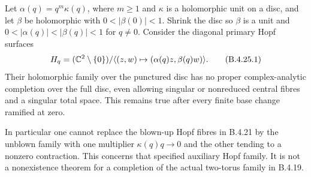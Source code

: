 \begin{proposition}
\label{push:B425}
Let $\alpha(q)=q^m\kappa(q)$, where $m\ge1$ and
$\kappa$ is a holomorphic unit on a disc, and let $\beta$
be holomorphic with $0<|\beta(0)|<1$. Shrink the disc so
$\beta$ is a unit and $0<|\alpha(q)|<|\beta(q)|<1$ for
$q\ne0$. Consider the diagonal primary Hopf surfaces
\[
 H_q=(\mathbb C^2\setminus\{0\})/
       \langle(z,w)\mapsto(\alpha(q)z,\beta(q)w)\rangle.
                                                        \tag{B.4.25.1}
\]
Their holomorphic family over the punctured disc has no
proper complex-analytic completion over the full disc,
even allowing singular or nonreduced central fibres and
a singular total space. This remains true after every
finite base change ramified at zero.

In particular one cannot replace the blown-up Hopf
fibres in B.4.21 by the unblown family with one multiplier
$\kappa(q)q\to0$ and the other tending to a nonzero
contraction. This concerns that specified auxiliary
Hopf family. It is not a nonexistence theorem for a
completion of the actual two-torus family in B.4.19.
\end{proposition}
